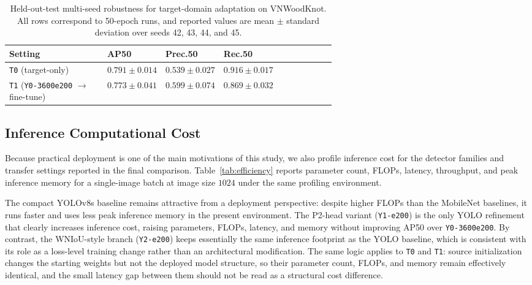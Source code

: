 \documentclass[10pt,a4paper]{article}
\begin{document}
\begin{table}[t]
  \centering
  \caption{Held-out-test multi-seed robustness for target-domain adaptation on VNWoodKnot. All rows correspond to 50-epoch runs, and reported values are mean $\pm$ standard deviation over seeds 42, 43, 44, and 45.}
  \label{tab:multiseed-transfer-test}
  \footnotesize
  \setlength{\tabcolsep}{4pt}
  \begin{tabularx}{\linewidth}{>{\raggedright\arraybackslash}p{0.30\linewidth} >{\raggedright\arraybackslash}p{0.16\linewidth} >{\raggedright\arraybackslash}p{0.16\linewidth} X}
    \toprule
    Setting & AP50 & Prec.50 & Rec.50 \\
    \midrule
    \texttt{T0} (target-only) & $0.791 \pm 0.014$ & $0.539 \pm 0.027$ & $0.916 \pm 0.017$ \\
    \texttt{T1} (\texttt{Y0-3600e200} $\rightarrow$ fine-tune) & $0.773 \pm 0.041$ & $0.599 \pm 0.074$ & $0.869 \pm 0.032$ \\
    \bottomrule
  \end{tabularx}
\end{table}

\subsection{Inference Computational Cost}
\label{sec:efficiency-results}

Because practical deployment is one of the main motivations of this study, we also profile inference cost for the detector families and transfer settings reported in the final comparison. Table~\ref{tab:efficiency} reports parameter count, FLOPs, latency, throughput, and peak inference memory for a single-image batch at image size $1024$ under the same profiling environment.

The compact YOLOv8s baseline remains attractive from a deployment perspective: despite higher FLOPs than the MobileNet baselines, it runs faster and uses less peak inference memory in the present environment. The P2-head variant (\texttt{Y1-e200}) is the only YOLO refinement that clearly increases inference cost, raising parameters, FLOPs, latency, and memory without improving AP50 over \texttt{Y0-3600e200}. By contrast, the WNIoU-style branch (\texttt{Y2-e200}) keeps essentially the same inference footprint as the YOLO baseline, which is consistent with its role as a loss-level training change rather than an architectural modification. The same logic applies to \texttt{T0} and \texttt{T1}: source initialization changes the starting weights but not the deployed model structure, so their parameter count, FLOPs, and memory remain effectively identical, and the small latency gap between them should not be read as a structural cost difference.
\end{document}
